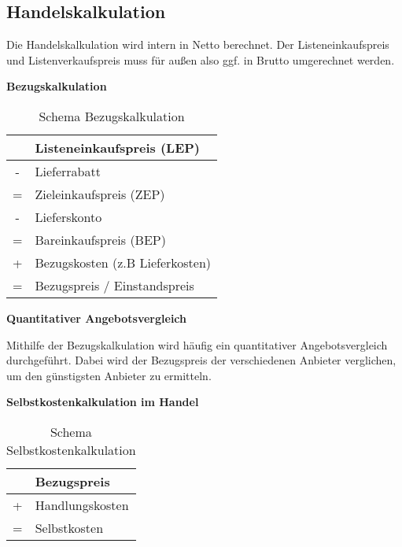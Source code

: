 \subsection{Handelskalkulation}

Die Handelskalkulation wird intern in Netto berechnet. Der Listeneinkaufspreis und Listenverkaufspreis muss für außen also ggf. in Brutto umgerechnet werden.

\textbf{Bezugskalkulation}

\begin{table}[H]
    \centering
    \begin{tabularx}{\textwidth}{c|X}
          & Listeneinkaufspreis (LEP)       \\
        \hline
        - & Lieferrabatt                    \\
        \hline
        = & Zieleinkaufspreis (ZEP)         \\
        \hline
        - & Lieferskonto                    \\
        \hline
        = & Bareinkaufspreis (BEP)          \\
        \hline
        + & Bezugskosten (z.B Lieferkosten) \\
        \hline
        = & Bezugspreis / Einstandspreis    \\
    \end{tabularx}
    \caption{Schema Bezugskalkulation}
    \label{tab:bezugskalkulation}
\end{table}

\textbf{Quantitativer Angebotsvergleich}

Mithilfe der Bezugskalkulation wird häufig ein quantitativer Angebotsvergleich durchgeführt. Dabei wird der Bezugspreis der verschiedenen Anbieter verglichen, um den günstigsten Anbieter zu ermitteln.

\textbf{Selbstkostenkalkulation im Handel}

\begin{table}[H]
    \centering
    \begin{tabularx}{\textwidth}{c|X}
          & Bezugspreis     \\
        \hline
        + & Handlungskosten \\
        \hline
        = & Selbstkosten    \\
    \end{tabularx}
    \caption{Schema Selbstkostenkalkulation}
    \label{tab:selbstkostenkalkulation}
\end{table}

